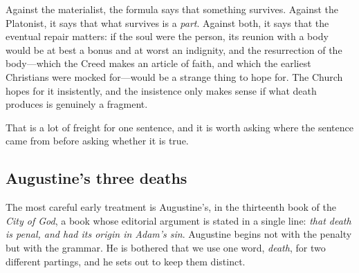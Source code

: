 Against the materialist, the formula says that something survives. Against the Platonist, it says that what survives is a \emph{part}. Against both, it says that the eventual repair matters: if the soul were the person, its reunion with a body would be at best a bonus and at worst an indignity, and the resurrection of the body---which the Creed makes an article of faith, and which the earliest Christians were mocked for---would be a strange thing to hope for. The Church hopes for it insistently, and the insistence only makes sense if what death produces is genuinely a fragment.

That is a lot of freight for one sentence, and it is worth asking where the sentence came from before asking whether it is true.

\subsection{Augustine's three deaths}

The most careful early treatment is Augustine's, in the thirteenth book of the \emph{City of God}, a book whose editorial argument is stated in a single line: \emph{that death is penal, and had its origin in Adam's sin}. Augustine begins not with the penalty but with the grammar. He is bothered that we use one word, \emph{death}, for two different partings, and he sets out to keep them distinct.

